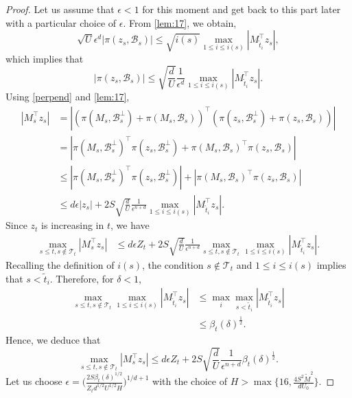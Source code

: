 \documentclass[11pt]{article}
\theoremstyle{plain}
\theoremstyle{definition}
\theoremstyle{remark}
\begin{document}
\begin{proof}
Let us assume that $\epsilon<1$ for this moment and get back to this part later with a particular choice of $\epsilon$. From \eqref{lem:17}, we obtain,
\[
\sqrt{U}\epsilon^{d}|\pi(z_s,\mathcal{B}_s)|\leq \sqrt{i(s)}\max_{1 \leq i \leq i(s)}|M_{\tilde t_i}^{\top}z_s|,
\]
which implies that
\begin{equation}
    |\pi(z_s,\mathcal{B}_s)|\leq \sqrt{\frac{d}{U}}\frac{1}{\epsilon^{d}}\max_{1 \leq i \leq i(s)}|M_{\tilde t_i}^{\top}z_s|.
\end{equation}
Using \eqref{perpend} and \eqref{lem:17},
\begin{align*}
    |M_s^{\top}z_s| &= |(\pi(M_s,\mathcal{B}^\perp_s)+\pi(M_s,\mathcal{B}_s))^{\top}(\pi(z_s,\mathcal{B}^\perp_s)+\pi(z_s,\mathcal{B}_s))|\\
    &=|\pi(M_s,\mathcal{B}^\perp_s)^{\top}\pi(z_s,\mathcal{B}^\perp_s)+\pi(M_s,\mathcal{B}_s)^{\top}\pi(z_s,\mathcal{B}_s)|\\
    &\leq |\pi(M_s,\mathcal{B}^\perp_s)^{\top}\pi(z_s,\mathcal{B}^\perp_s)|+|\pi(M_s,\mathcal{B}_s)^{\top}\pi(z_s,\mathcal{B}_s)|\\
    &\leq d\epsilon|z_s|+2S\sqrt{\frac{d}{U}}\frac{1}{\epsilon^{n+d}}\max_{1 \leq i \leq i(s)}|M_{\tilde t_i}^{\top}z_s|.
\end{align*}
Since $z_t$ is increasing in $t$, we have
\begin{align*}
    \max_{s\leq t,s\notin \mathcal{T}_{t}}|M_s^{\top}z_s| &\leq  d\epsilon Z_t+2S\sqrt{\frac{d}{U}}\frac{1}{\epsilon^{n+d}}\max_{s\leq t,s\notin \mathcal{T}_{t}}\max_{1 \leq i \leq i(s)}|M_{\tilde t_i}^{\top}z_s|.
\end{align*}
Recalling the definition of $i(s)$, the condition $s\notin \mathcal{T}_t$ and $1\leq i \leq i(s)$ implies that $s< \tilde t_i$. Therefore, for $\delta<1$,
\begin{align*}
\max_{s\leq t,s\notin \mathcal{T}_{t}}\max_{1 \leq i \leq i(s)}|M_{\tilde t_i}^{\top}z_s| &\leq \max_{i}\max_{s<\tilde t_i}|M_{\tilde t_i}^{\top}z_s| \\
& \leq \beta_t(\delta)^{\frac{1}{2}}.
\end{align*}
Hence, we deduce that
\begin{equation}\label{eq:mszs}
    \max_{s\leq t,s\notin \mathcal{T}_{t}}|M_s^{\top}z_s| 
    \leq d\epsilon Z_t+2S\sqrt{\frac{d}{U}}\frac{1}{\epsilon^{n+d}}\beta_{t}(\delta)^{\frac{1}{2}}.
\end{equation}
Let us choose $\epsilon  = \bigg(\frac{2S\beta_t(\delta)^{1/2}}{Z_td^{1/2}U^{1/2}H}\bigg)^{1/{d+1}}$ with the choice of $H>\max\{16,\frac{4S^2\tilde M^2}{dU_0}\}$.


\end{proof}
\end{document}
